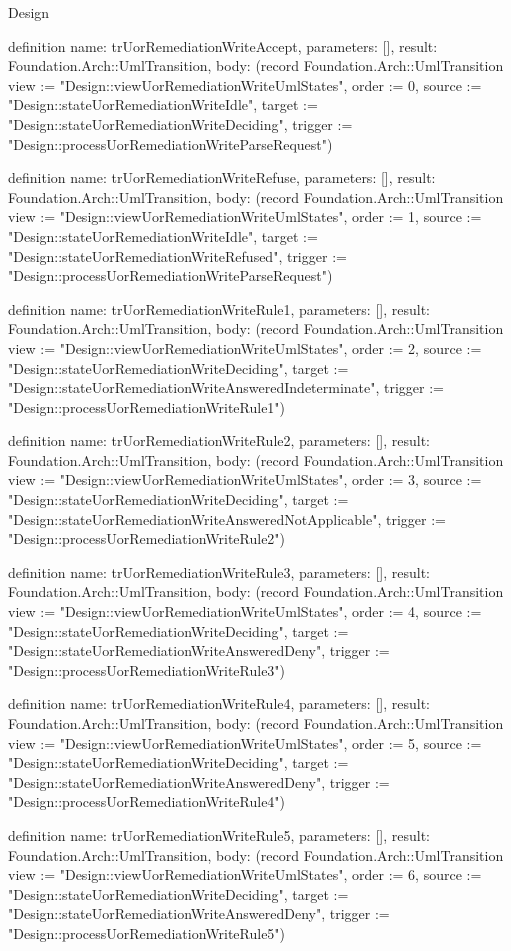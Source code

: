 \begin{lexlean}{Design}
\begin{semanticmodule}
definition{
  name: trUorRemediationWriteAccept,
  parameters: [],
  result: Foundation.Arch::UmlTransition,
  body: (record Foundation.Arch::UmlTransition {view := "Design::viewUorRemediationWriteUmlStates", order := 0, source := "Design::stateUorRemediationWriteIdle", target := "Design::stateUorRemediationWriteDeciding", trigger := "Design::processUorRemediationWriteParseRequest"})
}

definition{
  name: trUorRemediationWriteRefuse,
  parameters: [],
  result: Foundation.Arch::UmlTransition,
  body: (record Foundation.Arch::UmlTransition {view := "Design::viewUorRemediationWriteUmlStates", order := 1, source := "Design::stateUorRemediationWriteIdle", target := "Design::stateUorRemediationWriteRefused", trigger := "Design::processUorRemediationWriteParseRequest"})
}

definition{
  name: trUorRemediationWriteRule1,
  parameters: [],
  result: Foundation.Arch::UmlTransition,
  body: (record Foundation.Arch::UmlTransition {view := "Design::viewUorRemediationWriteUmlStates", order := 2, source := "Design::stateUorRemediationWriteDeciding", target := "Design::stateUorRemediationWriteAnsweredIndeterminate", trigger := "Design::processUorRemediationWriteRule1"})
}

definition{
  name: trUorRemediationWriteRule2,
  parameters: [],
  result: Foundation.Arch::UmlTransition,
  body: (record Foundation.Arch::UmlTransition {view := "Design::viewUorRemediationWriteUmlStates", order := 3, source := "Design::stateUorRemediationWriteDeciding", target := "Design::stateUorRemediationWriteAnsweredNotApplicable", trigger := "Design::processUorRemediationWriteRule2"})
}

definition{
  name: trUorRemediationWriteRule3,
  parameters: [],
  result: Foundation.Arch::UmlTransition,
  body: (record Foundation.Arch::UmlTransition {view := "Design::viewUorRemediationWriteUmlStates", order := 4, source := "Design::stateUorRemediationWriteDeciding", target := "Design::stateUorRemediationWriteAnsweredDeny", trigger := "Design::processUorRemediationWriteRule3"})
}

definition{
  name: trUorRemediationWriteRule4,
  parameters: [],
  result: Foundation.Arch::UmlTransition,
  body: (record Foundation.Arch::UmlTransition {view := "Design::viewUorRemediationWriteUmlStates", order := 5, source := "Design::stateUorRemediationWriteDeciding", target := "Design::stateUorRemediationWriteAnsweredDeny", trigger := "Design::processUorRemediationWriteRule4"})
}

definition{
  name: trUorRemediationWriteRule5,
  parameters: [],
  result: Foundation.Arch::UmlTransition,
  body: (record Foundation.Arch::UmlTransition {view := "Design::viewUorRemediationWriteUmlStates", order := 6, source := "Design::stateUorRemediationWriteDeciding", target := "Design::stateUorRemediationWriteAnsweredDeny", trigger := "Design::processUorRemediationWriteRule5"})
}


\end{semanticmodule}
\end{lexlean}

